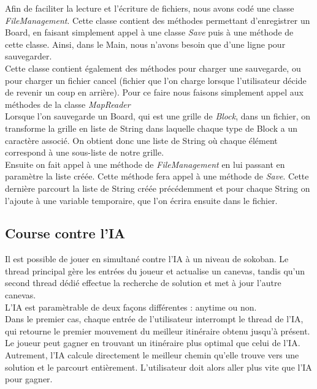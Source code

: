 \documentclass[a4paper,12pt]{article} %
\begin{document}
Afin de faciliter la lecture et l'écriture de fichiers, nous avons codé une classe \textit{FileManagement}. Cette classe contient des méthodes permettant d'enregistrer un Board, en faisant simplement appel à une classe \textit{Save} puis à une méthode de cette classe.
Ainsi, dans le Main, nous n'avons besoin que d'une ligne pour sauvegarder.
\\

Cette classe contient également des méthodes pour charger une sauvegarde, ou pour charger un fichier cancel (fichier que l'on charge lorsque l'utilisateur décide de revenir un coup en arrière). Pour ce faire nous faisons simplement appel aux méthodes de la classe \textit{MapReader}
\\

Lorsque l'on sauvegarde un Board, qui est une grille de \textit{Block}, dans un fichier, on transforme la grille en liste de String dans laquelle chaque type de Block a un caractère associé. On obtient donc une liste de String où chaque élément correspond à une sous-liste de notre grille.\\

Ensuite on fait appel à une méthode de \textit{FileManagement} en lui passant en paramètre la liste créée. Cette méthode fera appel à une méthode de \textit{Save}. Cette dernière parcourt la liste de String créée précédemment et pour chaque String on l'ajoute à une variable temporaire, que l'on écrira ensuite dans le fichier.

\subsection{Course contre l'IA}

Il est possible de jouer en simultané contre l'IA à un niveau de sokoban. Le thread principal gère les entrées du joueur et actualise un canevas, tandis qu'un second thread dédié effectue la recherche de solution et met à jour l'autre canevas.\\

L'IA est paramètrable de deux façons différentes : anytime ou non.\\
Dans le premier cas, chaque entrée de l'utilisateur interrompt le thread de l'IA, qui retourne le premier mouvement du meilleur itinéraire obtenu jusqu'à présent. Le joueur peut gagner en trouvant un itinéraire plus optimal que celui de l'IA.\\
Autrement, l'IA calcule directement le meilleur chemin qu'elle trouve vers une solution et le parcourt entièrement. L'utilisateur doit alors aller plus vite que l'IA pour gagner.\\
\end{document}
